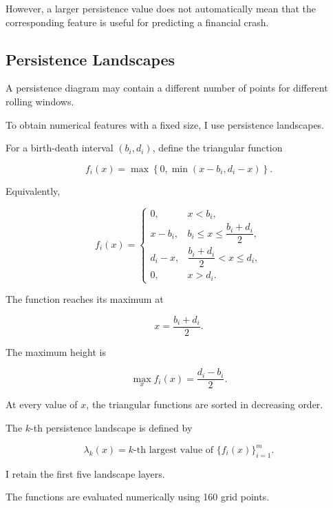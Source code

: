 \documentclass[oneside,english,11pt]{article}
\renewcommand{\boxed}[1]{#1}
\begin{document}
However, a larger persistence value
does not automatically mean that the
corresponding feature is useful for
predicting a financial crash.

\subsection{Persistence Landscapes}

A persistence diagram may contain a different
number of points for different rolling windows.

To obtain numerical features with a fixed size,
I use persistence landscapes.

For a birth-death interval $(b_i,d_i)$,
define the triangular function

\begin{equation}
\boxed{
f_i(x)
=
\max\left\{
0,
\min(x-b_i,d_i-x)
\right\}.
}
\end{equation}

Equivalently,

\begin{equation}
f_i(x)=
\begin{cases}
0,
& x<b_i,
\\
x-b_i,
& b_i\leq x\leq\dfrac{b_i+d_i}{2},
\\
d_i-x,
& \dfrac{b_i+d_i}{2}<x\leq d_i,
\\
0,
& x>d_i.
\end{cases}
\end{equation}

The function reaches its maximum at

\begin{equation}
x=\frac{b_i+d_i}{2}.
\end{equation}

The maximum height is

\begin{equation}
\boxed{
\max_x f_i(x)
=
\frac{d_i-b_i}{2}.
}
\end{equation}

At every value of $x$, the triangular functions
are sorted in decreasing order.

The $k$-th persistence landscape is defined by

\begin{equation}
\boxed{
\lambda_k(x)
=
\text{$k$-th largest value of }
\{f_i(x)\}_{i=1}^{m}.
}
\end{equation}

I retain the first five landscape layers.

The functions are evaluated numerically using
160 grid points.
\end{document}
